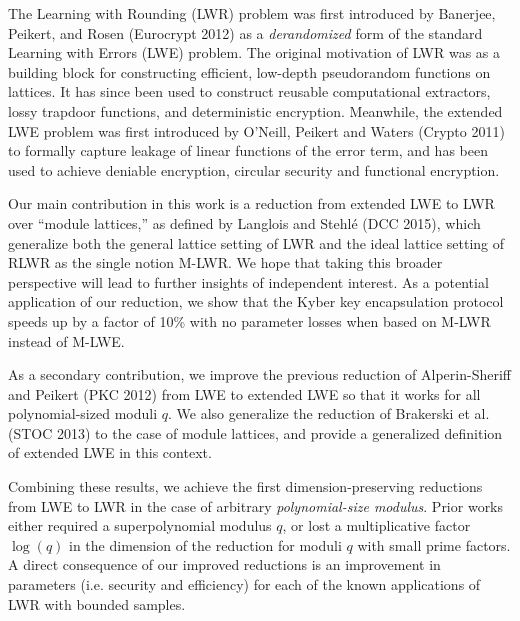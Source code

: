 The Learning with Rounding (LWR) problem was first introduced by Banerjee, Peikert, and Rosen (Eurocrypt 2012) as a \emph{derandomized}
form of the standard Learning with Errors (LWE) problem. The original motivation of LWR was as a building block for constructing efficient,
low-depth pseudorandom functions on lattices. It has since been used to construct reusable computational extractors, lossy trapdoor functions,
and deterministic encryption. Meanwhile, the extended LWE problem was first introduced by O'Neill, Peikert and Waters (Crypto 2011) to formally capture leakage of linear functions of the error term, and has been used to achieve deniable encryption, circular security and functional encryption.


Our main contribution in this work is a reduction from extended LWE to LWR over ``module lattices,'' as defined by Langlois and Stehl\'{e} (DCC 2015),
which generalize both the general lattice setting of LWR and the ideal lattice setting of RLWR as the single notion M-LWR. We hope that taking this broader perspective
will lead to further insights of independent interest. As a potential application of our reduction,  we show that the Kyber key encapsulation protocol speeds up by a factor of 10\% with no parameter losses when based on M-LWR instead of M-LWE.

As a secondary contribution, we improve the previous reduction of Alperin-Sheriff and Peikert (PKC 2012) from LWE to extended LWE so that it works for all polynomial-sized moduli $q$. We also generalize the reduction of Brakerski et al. 
(STOC 2013) to the case of module lattices, and provide a generalized definition of extended LWE in this context.

Combining these results, we achieve the first dimension-preserving reductions from LWE to LWR in the case of arbitrary \emph{polynomial-size modulus}.
Prior works either required a superpolynomial modulus $q$, or lost a multiplicative factor $\log(q)$ in the dimension of the reduction for moduli $q$ with small prime factors. A direct
consequence of our improved reductions is an improvement in parameters (i.e. security and efficiency) for each of the known applications of LWR with bounded samples.




